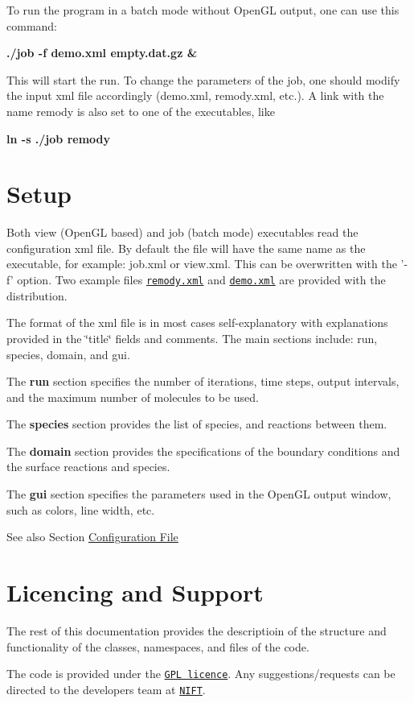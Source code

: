 To run the program in a batch mode without OpenGL output, one can use this command: \par
\par
{\bf  ./job -f demo.xml empty.dat.gz \& }\par
\par
 This will start the run. To change the parameters of the job, one should modify the input xml file accordingly (demo.xml, remody.xml, etc.). A link with the name remody is also set to one of the executables, like \par
\par
{\bf  ln -s ./job remody }\par
\par




 \hypertarget{index_SecSetup}{}\section{Setup}\label{index_SecSetup}
Both view (OpenGL based) and job (batch mode) executables read the configuration xml file. By default the file will have the same name as the executable, for example: job.xml or view.xml. This can be overwritten with the '-f' option. Two example files \href{../../run/remody.xml}{\tt remody.xml} and \href{../../run/demo.xml}{\tt demo.xml} are provided with the distribution.

The format of the xml file is in most cases self-explanatory with explanations provided in the \char`\"{}title\char`\"{} fields and comments. The main sections include: run, species, domain, and gui.

The {\bf run} section specifies the number of iterations, time steps, output intervals, and the maximum number of molecules to be used.

The {\bf species} section provides the list of species, and reactions between them.

The {\bf domain} section provides the specifications of the boundary conditions and the surface reactions and species.

The {\bf gui} section specifies the parameters used in the OpenGL output window, such as colors, line width, etc.

See also Section \hyperlink{Configfile_SecConfig}{Configuration File}



 \hypertarget{index_SecMisc}{}\section{Licencing and Support}\label{index_SecMisc}
The rest of this documentation provides the descriptioin of the structure and functionality of the classes, namespaces, and files of the code.

The code is provided under the \href{http://www.gnu.org/licenses/gpl.html}{\tt GPL licence}. Any suggestions/requests can be directed to the developers team at \href{http://nift.wvu.edu}{\tt NIFT}. 